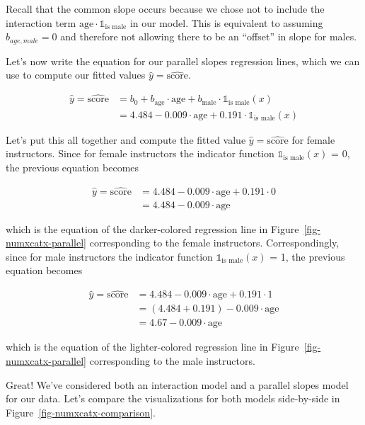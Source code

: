 \documentclass[
  letterpaper,
  DIV=11,
  numbers=noendperiod]{scrreprt}
\theoremstyle{definition}
\theoremstyle{remark}
\begin{document}
Recall that the common slope occurs because we chose not to include the
interaction term \(\mbox{age} \cdot \mathbb{1}_{\mbox{is male}}\) in our
model. This is equivalent to assuming \(b_{age,male} = 0\) and therefore
not allowing there to be an ``offset'' in slope for males.

Let's now write the equation for our parallel slopes regression lines,
which we can use to compute our fitted values
\(\widehat{y} = \widehat{\text{score}}\).

\[
\begin{aligned}
\widehat{y} = \widehat{\text{score}} &= b_0 + b_{\mbox{age}} \cdot \mbox{age} + b_{\mbox{male}} \cdot \mathbb{1}_{\mbox{is male}}(x)\\
&= 4.484 -0.009 \cdot \mbox{age} + 0.191 \cdot \mathbb{1}_{\mbox{is male}}(x) 
\end{aligned}
\]

Let's put this all together and compute the fitted value
\(\widehat{y} = \widehat{\text{score}}\) for female instructors. Since
for female instructors the indicator function
\(\mathbb{1}_{\mbox{is male}}(x)\) = 0, the previous equation becomes

\[
\begin{aligned}
\widehat{y} = \widehat{\text{score}} &= 4.484 -0.009    \cdot \mbox{age} + 0.191 \cdot 0\\
&= 4.484 -0.009 \cdot \mbox{age}
\end{aligned}
\]

which is the equation of the darker-colored regression line in
Figure~\ref{fig-numxcatx-parallel} corresponding to the female
instructors. Correspondingly, since for male instructors the indicator
function \(\mathbb{1}_{\mbox{is male}}(x)\) = 1, the previous equation
becomes

\[
\begin{aligned}
\widehat{y} = \widehat{\text{score}} &= 4.484 -0.009    \cdot \mbox{age} + 0.191 \cdot 1\\
&= (4.484 + 0.191) - 0.009 \cdot \mbox{age}\\
&= 4.67 -0.009 \cdot \mbox{age}
\end{aligned}
\]

which is the equation of the lighter-colored regression line in
Figure~\ref{fig-numxcatx-parallel} corresponding to the male
instructors.

Great! We've considered both an interaction model and a parallel slopes
model for our data. Let's compare the visualizations for both models
side-by-side in Figure~\ref{fig-numxcatx-comparison}.
\end{document}
